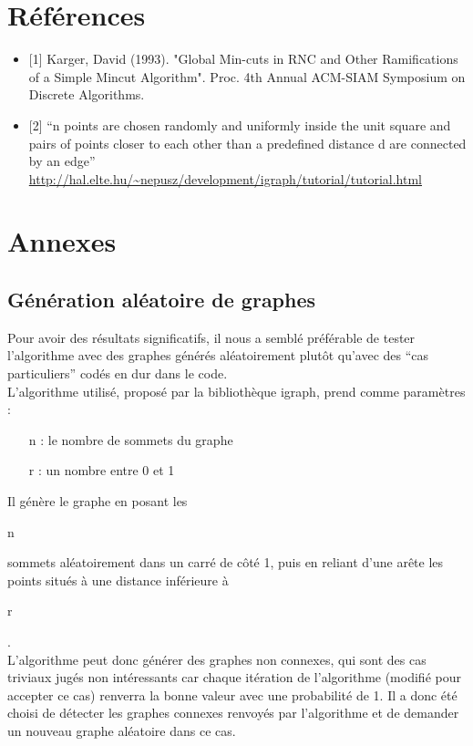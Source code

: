 \documentclass[a4paper,10pt]{article}
\begin{document}
\section{Références}

\begin{itemize}
  \item {[}1] Karger, David (1993). "Global Min-cuts in RNC and Other Ramifications of a Simple Mincut Algorithm". Proc. 4th Annual ACM-SIAM Symposium on Discrete Algorithms.
  \item {[}2] ``n points are chosen randomly and uniformly inside the unit square and pairs of points closer to each other than a predefined distance d are connected by an edge'' \url{http://hal.elte.hu/~nepusz/development/igraph/tutorial/tutorial.html}
\end{itemize}


\section{Annexes}
\subsection{Génération aléatoire de graphes}

Pour avoir des résultats significatifs, il nous a semblé préférable de tester l'algorithme avec des graphes générés aléatoirement plutôt qu'avec des ``cas particuliers'' codés en dur dans le code.\\

L'algorithme utilisé, proposé par la bibliothèque igraph, prend comme paramètres :
\begin{itemize}
 \item[n] : le nombre de sommets du graphe
 \item[r] : un nombre entre 0 et 1
\end{itemize}
Il génère le graphe en posant les \begin{it}n\end{it} sommets aléatoirement dans un carré de côté 1, puis en reliant d'une arête les points situés à une distance inférieure à \begin{it}r\end{it}.\\

L'algorithme peut donc générer des graphes non connexes, qui sont des cas triviaux jugés non intéressants car chaque itération de l'algorithme (modifié pour accepter ce cas) renverra la bonne
valeur avec une probabilité de 1. Il a donc été choisi de détecter les graphes connexes renvoyés par l'algorithme et de demander un nouveau graphe aléatoire dans ce cas.\\
\end{document}
